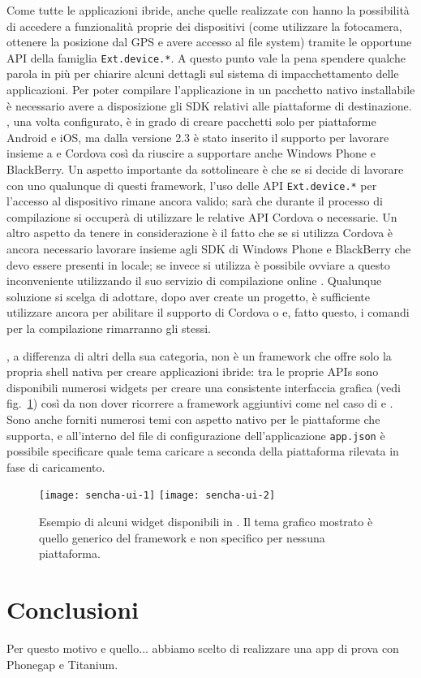 			Come tutte le applicazioni ibride, anche quelle realizzate con
			\senchat{} hanno la possibilità di accedere a funzionalità proprie
			dei dispositivi (come utilizzare la fotocamera, ottenere la posizione
			dal GPS e avere accesso al file sys\-tem) tramite le opportune API
			della famiglia \verb|Ext.device.*|. A questo punto vale la pena
			spendere qualche parola in più per chiarire alcuni dettagli sul
			sistema di impacchettamento delle applicazioni. Per poter compilare
			l'applicazione in un pacchetto nativo installabile è necessario
			avere a disposizione gli SDK relativi alle piattaforme di destinazione.
			\senchacmd{}, una volta configurato, è in grado di creare pacchetti
			solo per piattaforme Android e iOS, ma dalla versione 2.3 è stato
			inserito il supporto per lavorare insieme a \pg{} e Cordova così da
			riuscire a supportare anche Windows Phone e BlackBerry. Un aspetto
			importante da sottolineare è che se si decide di lavorare con uno
			qualunque di questi framework, l'uso delle API \verb|Ext.device.*| per
			l'accesso al dispositivo rimane ancora valido; sarà \senchacmd{} che
			durante il processo di compilazione si occuperà di utilizzare le
			relative API Cordova o \pg{} necessarie. Un altro aspetto da
			tenere in considerazione è il fatto che se si utilizza Cordova è
			ancora necessario lavorare insieme agli SDK di Windows Phone e BlackBerry
			che devo essere presenti in locale; se invece si utilizza \pg{} è
			possibile ovviare a questo inconveniente utilizzando il suo servizio
			di compilazione online \pgb{}. Qualunque soluzione si scelga di
			adottare, dopo aver create un progetto, è sufficiente utilizzare
			ancora \senchacmd{} per abilitare il supporto di Cordova o \pg{} e,
			fatto questo, i comandi per la compilazione rimarranno gli stessi.
			
			\senchat{}, a differenza di altri della sua categoria, non è un
			framework che offre	solo la propria shell nativa per creare
			applicazioni ibride: tra le	proprie APIs sono disponibili numerosi
			widgets per creare una consistente interfaccia grafica
			(vedi fig.~\ref{fig:senchaui}) così da non dover ricorrere a
			framework aggiuntivi come nel caso di \pg{} e \rhom{}. Sono anche
			forniti numerosi temi con aspetto nativo per le piattaforme che
			supporta, e all'interno del file di configurazione dell'applicazione
			\verb|app.json| è possibile specificare quale tema caricare a
			seconda della piattaforma rilevata in fase di caricamento.
			\begin{figure}
				\centering
				\texttt{[image: sencha-ui-1]}
				\texttt{[image: sencha-ui-2]}
				\label{fig:senchaui}
				\caption{
					Esempio di alcuni widget disponibili in \senchat{}.
					Il tema grafico mostrato è quello generico del framework e
					non specifico per nessuna piattaforma.
				}
			\end{figure}
			
	
	\section{Conclusioni}
		Per questo motivo e quello... abbiamo scelto di realizzare una app di 
		prova con Phonegap e Titanium.
